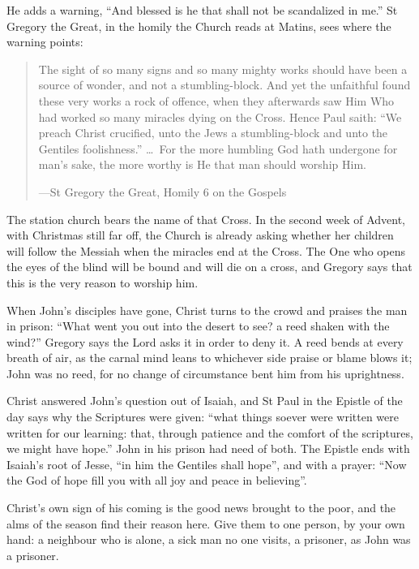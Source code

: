 He adds a warning, ``And blessed is he that shall not be scandalized in me.''
St Gregory the Great, in the homily the Church reads at Matins, sees where the
warning points:

\begin{quote}
The sight of so many signs and so many mighty works should have been a source
of wonder, and not a stumbling-block. And yet the unfaithful found these very
works a rock of offence, when they afterwards saw Him Who had worked so many
miracles dying on the Cross. Hence Paul saith: ``We preach Christ crucified, unto
the Jews a stumbling-block and unto the Gentiles foolishness.'' \dots\ For the
more humbling God hath undergone for man's sake, the more worthy is He that man
should worship Him.\par
{\smallskip\noindent\small ---St Gregory the Great, Homily 6 on the Gospels\par}
\end{quote}

The station church bears the name of that Cross. In the second week of Advent,
with Christmas still far off, the Church is already asking whether her children
will follow the Messiah when the miracles end at the Cross. The One who opens
the eyes of the blind will be bound and will die on a cross, and Gregory says
that this is the very reason to worship him.

When John's disciples have gone, Christ turns to the crowd and praises the man
in prison: ``What went you out into the desert to see? a reed shaken with the
wind?'' Gregory says the Lord asks it in order to deny it. A reed bends at every
breath of air, as the carnal mind leans to whichever side praise or blame blows
it; John was no reed, for no change of circumstance bent him from his
uprightness.

Christ answered John's question out of Isaiah, and St Paul in the Epistle of the
day says why the Scriptures were given: ``what things soever were written were
written for our learning: that, through patience and the comfort of the
scriptures, we might have hope.'' John in his prison had need of both. The
Epistle ends with Isaiah's root of Jesse, ``in him the Gentiles shall hope'', and
with a prayer: ``Now the God of hope fill you with all joy and peace in
believing''.

Christ's own sign of his coming is the good news brought to the poor, and the
alms of the season find their reason here. Give them to one person, by your
own hand: a neighbour who is alone, a sick man no one visits, a prisoner, as
John was a prisoner.

